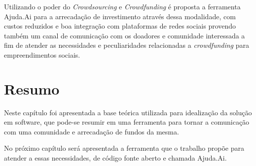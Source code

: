 Utilizando o poder do \emph{Crowdsourcing} e \emph{Crowdfunding} é proposta a ferramenta Ajuda.Ai para a arrecadação de investimento através dessa modalidade, com custos reduzidos e boa integração com plataformas de redes sociais provendo também um canal de comunicação com os doadores e comunidade interessada a fim de atender as necessidades e peculiaridades relacionadas a \emph{crowdfunding} para empreendimentos sociais.



\section*{Resumo}
Neste capítulo foi apresentada a base teórica utilizada para idealização da solução em software, que pode-se resumir em uma ferramenta para tornar a comunicação com uma comunidade e arrecadação de fundos da mesma.

No próximo capítulo será apresentada a ferramenta que o trabalho propõe para atender a essas necessidades, de código fonte aberto e chamada Ajuda.Ai.